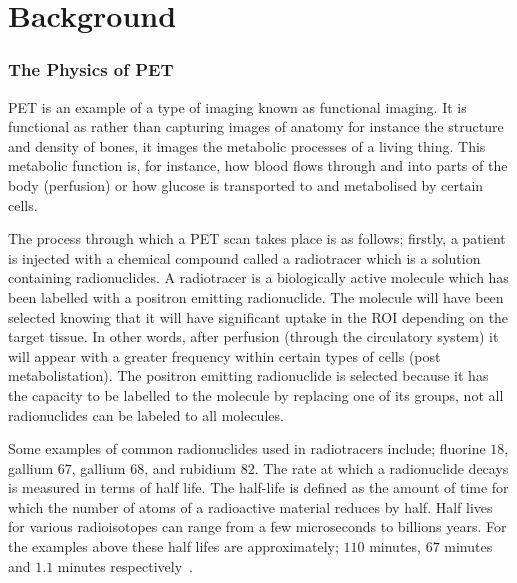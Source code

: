 \chapter{Background} \label{background}
    \blindtext
    
        \blindtext
        
        \subsection{The Physics of PET} \label{the_physics_of_pet}
            \gls{PET} is an example of a type of imaging known as functional imaging. It is functional as rather than capturing images of anatomy for instance the structure and density of bones, it images the metabolic processes of a living thing. This metabolic function is, for instance, how blood flows through and into parts of the body (perfusion) or how glucose is transported to and metabolised by certain cells.
            
            The process through which a \gls{PET} scan takes place is as follows; firstly, a patient is injected with a chemical compound called a radiotracer which is a solution containing radionuclides. A radiotracer is a biologically active molecule which has been labelled with a positron emitting radionuclide. The molecule will have been selected knowing that it will have significant uptake in the \gls{ROI} depending on the target tissue. In other words, after perfusion (through the circulatory system) it will appear with a greater frequency within certain types of cells (post metabolistation). The positron emitting radionuclide is selected because it has the capacity to be labelled to the molecule by replacing one of its groups, not all radionuclides can be labeled to all molecules. %
            
            Some examples of common radionuclides used in radiotracers include; fluorine $18$, gallium $67$, gallium $68$, and rubidium $82$. The rate at which a radionuclide decays is measured in terms of half life. The half-life is defined as the amount of time for which the number of atoms of a radioactive material reduces by half. Half lives for various radioisotopes can range from a few microseconds to billions years. For the examples above these half lifes are approximately; $110$ minutes, $67$ minutes and $1.1$ minutes respectively~.
            
